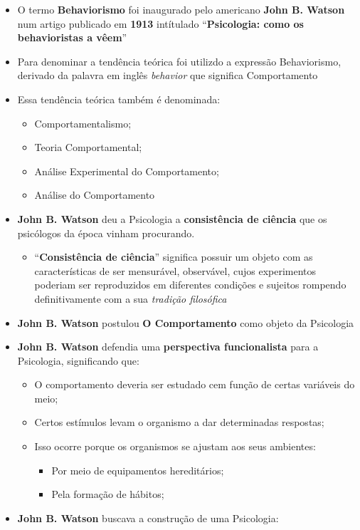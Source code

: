 \documentclass[
]{book}
\providecommand{\tightlist}{%
  \setlength{\itemsep}{0pt}\setlength{\parskip}{0pt}}
\begin{document}
\begin{itemize}
\tightlist
\item
  O termo \textbf{Behaviorismo} foi inaugurado pelo americano
  \textbf{John B. Watson} num artigo publicado em \textbf{1913}
  intítulado ``\textbf{Psicologia: como os behavioristas a vêem}''
\item
  Para denominar a tendência teórica foi utilizdo a expressão
  Behaviorismo, derivado da palavra em inglês \emph{behavior} que
  significa Comportamento
\item
  Essa tendência teórica também é denominada:

  \begin{itemize}
  \tightlist
  \item
    Comportamentalismo;
  \item
    Teoria Comportamental;
  \item
    Análise Experimental do Comportamento;
  \item
    Análise do Comportamento
  \end{itemize}
\item
  \textbf{John B. Watson} deu a Psicologia a \textbf{consistência de
  ciência} que os psicólogos da época vinham procurando.

  \begin{itemize}
  \tightlist
  \item
    ``\textbf{Consistência de ciência}'' significa possuir um objeto com
    as características de ser mensurável, observável, cujos experimentos
    poderiam ser reproduzidos em diferentes condições e sujeitos
    rompendo definitivamente com a sua \emph{tradição filosófica}
  \end{itemize}
\item
  \textbf{John B. Watson} postulou \textbf{O Comportamento} como objeto
  da Psicologia
\item
  \textbf{John B. Watson} defendia uma \textbf{perspectiva
  funcionalista} para a Psicologia, significando que:

  \begin{itemize}
  \tightlist
  \item
    O comportamento deveria ser estudado cem função de certas variáveis
    do meio;
  \item
    Certos estímulos levam o organismo a dar determinadas respostas;
  \item
    Isso ocorre porque os organismos se ajustam aos seus ambientes:

    \begin{itemize}
    \tightlist
    \item
      Por meio de equipamentos hereditários;
    \item
      Pela formação de hábitos;
    \end{itemize}
  \end{itemize}
\item
  \textbf{John B. Watson} buscava a construção de uma Psicologia:


\end{itemize}
\end{document}
